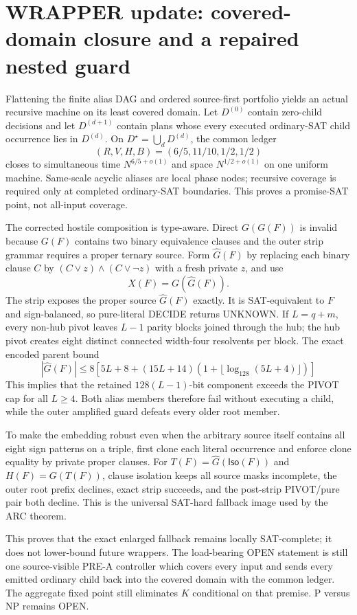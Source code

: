 \section{WRAPPER update: covered-domain closure and a repaired nested guard}

Flattening the finite alias DAG and ordered source-first portfolio yields an
actual recursive machine on its least covered domain.  Let $D^{(0)}$ contain
zero-child decisions and let $D^{(d+1)}$ contain plans whose every executed
ordinary-SAT child occurrence lies in $D^{(d)}$.  On
$D^\star=\bigcup_dD^{(d)}$, the common ledger
\[
 (R,V,H,B)=(6/5,11/10,1/2,1/2)
\]
closes to simultaneous time $N^{6/5+o(1)}$ and space $N^{1/2+o(1)}$ on one
uniform machine.  Same-scale acyclic aliases are local phase nodes; recursive
coverage is required only at completed ordinary-SAT boundaries.  This proves
a promise-SAT point, not all-input coverage.

The corrected hostile composition is type-aware.  Direct $G(G(F))$ is
invalid because $G(F)$ contains two binary equivalence clauses and the outer
strip grammar requires a proper ternary source.  Form $\widehat G(F)$ by
replacing each binary clause $C$ by
$(C\vee z)\wedge(C\vee\neg z)$ with a fresh private $z$, and use
\[
                         X(F)=G(\widehat G(F)).
\]
The strip exposes the proper source $\widehat G(F)$ exactly.  It is
SAT-equivalent to $F$ and sign-balanced, so pure-literal DECIDE returns
UNKNOWN.  If $L=q+m$, every non-hub pivot leaves $L-1$ parity blocks joined
through the hub; the hub pivot creates eight distinct connected width-four
resolvents per block.  The exact encoded parent bound
\[
|\widehat G(F)|\le8[5L+8+(15L+14)
(1+\lfloor\log_{128}(5L+4)\rfloor)]
\]
This implies that the retained
$128(L-1)$-bit component exceeds the PIVOT cap for all $L\ge4$.  Both alias
members therefore fail without executing a child, while the outer amplified
guard defeats every older root member.

To make the embedding robust even when the arbitrary source itself contains
all eight sign patterns on a triple, first clone each literal occurrence and
enforce clone equality by private proper clauses.  For
$T(F)=\widehat G(\mathsf{Iso}(F))$ and $H(F)=G(T(F))$, clause isolation keeps
all source masks incomplete, the outer root prefix declines, exact strip
succeeds, and the post-strip PIVOT/pure pair both decline.  This is the
universal SAT-hard fallback image used by the ARC theorem.

This proves that the exact enlarged fallback remains locally SAT-complete;
it does not lower-bound future wrappers.  The load-bearing OPEN statement is
still one source-visible PRE-A controller which covers every input and sends
every emitted ordinary child back into the covered domain with the common
ledger.  The aggregate fixed point still eliminates $K$ conditional on that
premise.  P versus NP remains OPEN.
